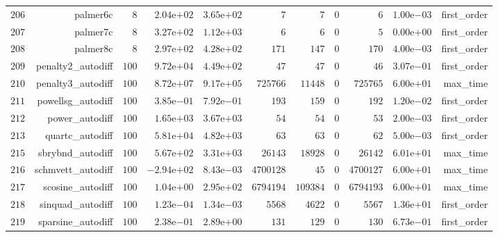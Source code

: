 \documentclass[varwidth=20cm,crop=true]{standalone}
\begin{document}
\begin{longtable}{rrrrrrrrrrr}
  \(   206\) & palmer6c & \(     8\) & \( 2.04\)e\(+02\) & \( 3.65\)e\(+02\) & \(     7\) & \(     7\) & \(     0\) & \(     6\) & \( 1.00\)e\(-03\) & first\_order \\
  \(   207\) & palmer7c & \(     8\) & \( 3.27\)e\(+02\) & \( 1.12\)e\(+03\) & \(     6\) & \(     6\) & \(     0\) & \(     5\) & \( 0.00\)e\(+00\) & first\_order \\
  \(   208\) & palmer8c & \(     8\) & \( 2.97\)e\(+02\) & \( 4.28\)e\(+02\) & \(   171\) & \(   147\) & \(     0\) & \(   170\) & \( 4.00\)e\(-03\) & first\_order \\
  \(   209\) & penalty2\_autodiff & \(   100\) & \( 9.72\)e\(+04\) & \( 4.49\)e\(+02\) & \(    47\) & \(    47\) & \(     0\) & \(    46\) & \( 3.07\)e\(-01\) & first\_order \\
  \(   210\) & penalty3\_autodiff & \(   100\) & \( 8.72\)e\(+07\) & \( 9.17\)e\(+05\) & \(725766\) & \( 11448\) & \(     0\) & \(725765\) & \( 6.00\)e\(+01\) & max\_time \\
  \(   211\) & powellsg\_autodiff & \(   100\) & \( 3.85\)e\(-01\) & \( 7.92\)e\(-01\) & \(   193\) & \(   159\) & \(     0\) & \(   192\) & \( 1.20\)e\(-02\) & first\_order \\
  \(   212\) & power\_autodiff & \(   100\) & \( 1.65\)e\(+03\) & \( 3.67\)e\(+03\) & \(    54\) & \(    54\) & \(     0\) & \(    53\) & \( 2.00\)e\(-03\) & first\_order \\
  \(   213\) & quartc\_autodiff & \(   100\) & \( 5.81\)e\(+04\) & \( 4.82\)e\(+03\) & \(    63\) & \(    63\) & \(     0\) & \(    62\) & \( 5.00\)e\(-03\) & first\_order \\
  \(   215\) & sbrybnd\_autodiff & \(   100\) & \( 5.67\)e\(+02\) & \( 3.31\)e\(+03\) & \( 26143\) & \( 18928\) & \(     0\) & \( 26142\) & \( 6.01\)e\(+01\) & max\_time \\
  \(   216\) & schmvett\_autodiff & \(   100\) & \(-2.94\)e\(+02\) & \( 8.43\)e\(-03\) & \(4700128\) & \(    45\) & \(     0\) & \(4700127\) & \( 6.00\)e\(+01\) & max\_time \\
  \(   217\) & scosine\_autodiff & \(   100\) & \( 1.04\)e\(+00\) & \( 2.95\)e\(+02\) & \(6794194\) & \(109384\) & \(     0\) & \(6794193\) & \( 6.00\)e\(+01\) & max\_time \\
  \(   218\) & sinquad\_autodiff & \(   100\) & \( 1.23\)e\(-04\) & \( 1.34\)e\(-03\) & \(  5568\) & \(  4622\) & \(     0\) & \(  5567\) & \( 1.36\)e\(+01\) & first\_order \\
  \(   219\) & sparsine\_autodiff & \(   100\) & \( 2.38\)e\(-01\) & \( 2.89\)e\(+00\) & \(   131\) & \(   129\) & \(     0\) & \(   130\) & \( 6.73\)e\(-01\) & first\_order \\

\end{longtable}
\end{document}
